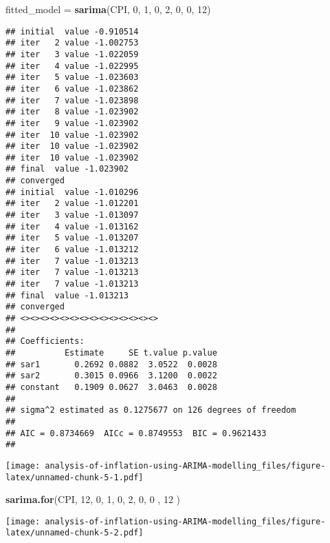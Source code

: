 \documentclass[
  12pt,
]{article}
\newenvironment{Shaded}{\begin{snugshade}}{\end{snugshade}}
\newcommand{\DecValTok}[1]{\textcolor[rgb]{0.00,0.00,0.81}{#1}}
\newcommand{\FunctionTok}[1]{\textcolor[rgb]{0.13,0.29,0.53}{\textbf{#1}}}
\newcommand{\NormalTok}[1]{#1}
\newcommand{\OtherTok}[1]{\textcolor[rgb]{0.56,0.35,0.01}{#1}}
\begin{document}
\begin{Shaded}
\begin{Highlighting}[]
\NormalTok{fitted\_model }\OtherTok{=} \FunctionTok{sarima}\NormalTok{(CPI, }\DecValTok{0}\NormalTok{, }\DecValTok{1}\NormalTok{, }\DecValTok{0}\NormalTok{, }\DecValTok{2}\NormalTok{, }\DecValTok{0}\NormalTok{, }\DecValTok{0}\NormalTok{, }\DecValTok{12}\NormalTok{)}
\end{Highlighting}
\end{Shaded}

\begin{verbatim}
## initial  value -0.910514 
## iter   2 value -1.002753
## iter   3 value -1.022059
## iter   4 value -1.022995
## iter   5 value -1.023603
## iter   6 value -1.023862
## iter   7 value -1.023898
## iter   8 value -1.023902
## iter   9 value -1.023902
## iter  10 value -1.023902
## iter  10 value -1.023902
## iter  10 value -1.023902
## final  value -1.023902 
## converged
## initial  value -1.010296 
## iter   2 value -1.012201
## iter   3 value -1.013097
## iter   4 value -1.013162
## iter   5 value -1.013207
## iter   6 value -1.013212
## iter   7 value -1.013213
## iter   7 value -1.013213
## iter   7 value -1.013213
## final  value -1.013213 
## converged
## <><><><><><><><><><><><><><>
##  
## Coefficients: 
##          Estimate     SE t.value p.value
## sar1       0.2692 0.0882  3.0522  0.0028
## sar2       0.3015 0.0966  3.1200  0.0022
## constant   0.1909 0.0627  3.0463  0.0028
## 
## sigma^2 estimated as 0.1275677 on 126 degrees of freedom 
##  
## AIC = 0.8734669  AICc = 0.8749553  BIC = 0.9621433 
## 
\end{verbatim}

\texttt{[image: analysis-of-inflation-using-ARIMA-modelling\_files/figure-latex/unnamed-chunk-5-1.pdf]}

\begin{Shaded}
\begin{Highlighting}[]
\FunctionTok{sarima.for}\NormalTok{(CPI, }\DecValTok{12}\NormalTok{, }\DecValTok{0}\NormalTok{, }\DecValTok{1}\NormalTok{, }\DecValTok{0}\NormalTok{, }\DecValTok{2}\NormalTok{, }\DecValTok{0}\NormalTok{, }\DecValTok{0}\NormalTok{ , }\DecValTok{12}\NormalTok{ )}
\end{Highlighting}
\end{Shaded}

\texttt{[image: analysis-of-inflation-using-ARIMA-modelling\_files/figure-latex/unnamed-chunk-5-2.pdf]}
\end{document}
